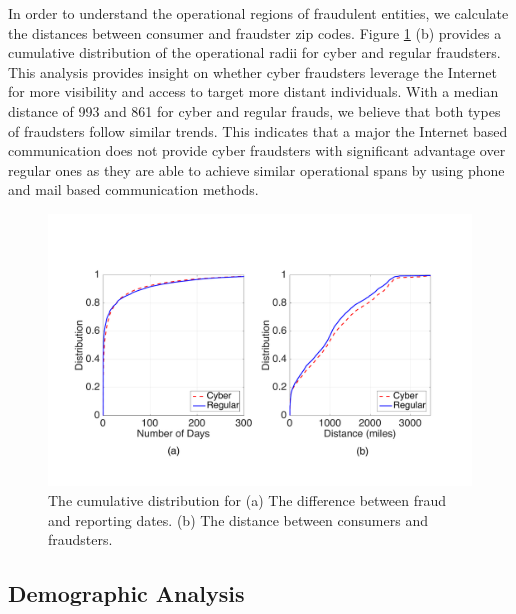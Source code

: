\documentclass[conference]{IEEEtran}
\begin{document}
In order to understand the operational regions of fraudulent entities, we calculate the distances between consumer and fraudster zip codes. Figure \ref{reportingfig} (b) provides a cumulative distribution of the operational radii for cyber and regular fraudsters.  This analysis provides insight on whether cyber fraudsters leverage the Internet for more visibility and access to target more distant individuals. With a median distance of 993 and 861 for cyber and regular frauds, we believe that both types of fraudsters follow similar trends. This indicates that a major the Internet based communication does not provide cyber fraudsters with significant advantage over regular ones as they are able to achieve similar operational spans by using phone and mail based communication methods.

\begin{figure}[t]
\centering
  \includegraphics[scale=0.28]{graphics/dist_days.pdf}
  \caption{The cumulative distribution for (a) The difference between fraud and reporting dates. (b) The distance between consumers and fraudsters.}
  \label{reportingfig}
\end{figure}


\subsection{Demographic Analysis}\label{fraudsters}
\end{document}
